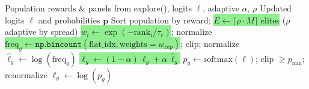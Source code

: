 \documentclass[8pt]{article}
\begin{document}
\vspace{4pt}

\begin{tcolorbox}[
    title={\textbf{Algorithm 2b:} Explore Best --- Logit-space CEM with rank-based elite weights},
    colback=lightgreen!20, colframe=added!80, fonttitle=\small\bfseries,
    boxrule=0.5pt, arc=2pt, left=4pt, right=4pt, top=2pt, bottom=2pt
]
\begin{algorithmic}[1]
\small
\Require Population rewards \& panels from explore(), logits $\boldsymbol{\ell}$, adaptive $\alpha$, $\rho$
\Ensure Updated logits $\boldsymbol{\ell}$ and probabilities $\mathbf{p}$
\State Sort population by reward; \colorbox{lightgreen}{$E \gets \lceil \rho \cdot M \rceil$ elites} ($\rho$ adaptive by spread)
\State \colorbox{lightgreen}{$w_i \gets \exp(-\text{rank}_i / \tau_r)$}; normalize 
\State \colorbox{lightgreen}{$\text{freq}_g \gets \texttt{np.bincount}(\text{flat\_idx}, \text{weights}=w_\text{rep})$}; clip; normalize
\State $\hat{\ell}_g \gets \log(\text{freq}_g)$
    \State \colorbox{lightgreen}{$\ell_g \gets (1 - \alpha)\,\ell_g + \alpha\,\hat{\ell}_g$} 
\EndFor
\State $p_g \gets \text{softmax}(\boldsymbol{\ell})$; clip $\geq p_\text{min}$; renormalize
\State $\ell_g \gets \log(p_g)$ 
\end{algorithmic}
\end{tcolorbox}

\vspace{4pt}
\end{document}
